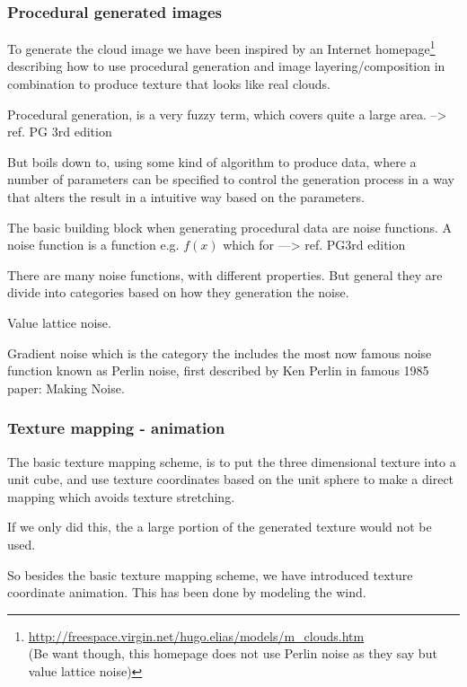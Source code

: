 \subsubsection{Procedural generated images}
To generate the cloud image we have been inspired by an Internet
homepage\footnote{\url{http://freespace.virgin.net/hugo.elias/models/m_clouds.htm}
  \\(Be want though, this homepage does not use Perlin noise as they
  say but value lattice noise)}
describing how to use procedural generation and
image layering/composition in combination to produce texture that
looks like real clouds.

Procedural generation, is a very fuzzy term, which covers quite a
large area.
--> ref. PG 3rd edition

But boils down to, using some kind of algorithm to produce data, where
a number of parameters can be specified to control the
generation process in a way that alters the result in a intuitive way
based on the parameters.

The basic building block when generating procedural data are noise
functions. A noise function is a function e.g. $f(x)$ which for 
---> ref. PG3rd edition

There are many noise functions, with different properties. But general
they are divide into categories based on how they generation the
noise.

Value lattice noise.

Gradient noise which is the category the includes the most 
now famous noise function known as Perlin noise, first described by Ken
Perlin in famous 1985 paper: Making Noise. 


\subsubsection{Texture mapping - animation}
The basic texture mapping scheme, is to put the three dimensional
texture into a unit cube, and use texture coordinates based on the
unit sphere to make a direct mapping which avoids texture stretching.

If we only did this, the a large portion of the generated texture
would not be used.

So besides the basic texture mapping scheme, we have introduced
texture coordinate animation. This has been done by modeling the wind.








